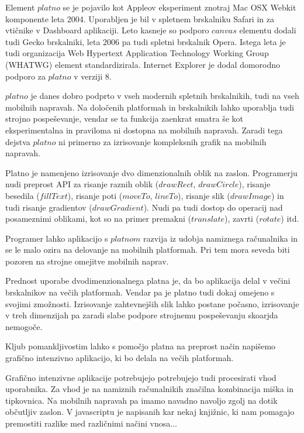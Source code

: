 Element $platno$ se je pojavilo kot Appleov eksperiment znotraj Mac OSX Webkit komponente leta 2004. Uporabljen je bil v spletnem brskalniku Safari in za vtičnike v Dashboard aplikaciji. Leto kasneje so podporo $canvas$ elementu dodali tudi Gecko brskalniki, leta 2006 pa tudi spletni brskalnik Opera. Istega leta je tudi organizacija Web Hypertext Application Technology Working Group (WHATWG) element standardizirala. Internet Explorer je dodal domorodno podporo za $platno$ v verziji 8.

$platno$ je danes dobro podprto v vseh modernih spletnih brskalnikih, tudi na vseh mobilnih napravah. Na določenih platformah in brskalnikih lahko uporablja tudi strojno pospeševanje, vendar se ta funkcija zaenkrat smatra še kot eksperimentalna in praviloma ni dostopna na mobilnih napravah. Zaradi tega dejstva $platno$ ni primerno za izrisovanje kompleksnih grafik na mobilnih napravah.

Platno je namenjeno izrisovanje dvo dimenzionalnih oblik na zaslon. Programerju nudi preprost API za risanje raznih oblik ($drawRect$, $drawCircle$), risanje besedila ($fillText$), risanje poti ($moveTo$, $lineTo$), risanje slik ($drawImage$) in tudi risanje gradientov ($drawGradient$). Nudi pa tudi dostop do operacij nad posameznimi oblikami, kot so na primer premakni ($translate$), zavrti ($rotate$) itd. 

Programer lahko aplikacijo s $platnom$ razvija iz udobja namiznega računalnika in se le malo ozira na delovanje na mobilnih platformah. Pri tem mora seveda biti pozoren na strojne omejitve mobilnih naprav. 

Prednost uporabe dvodimenzionalnega platna je, da bo aplikacija delal v večini brskalnikov na večih platformah. Vendar pa je platno tudi dokaj omejeno s svojimi zmožnosti. Izrisovanje zahtevnejših slik lahko postane počasno, izrisovanje v treh dimenzijah pa zaradi slabe podpore strojnemu pospeševanju skoarjda nemogoče. 

Kljub pomankljivostim lahko s pomočjo platna na preprost način napišemo grafično intenzivno aplikacijo, ki bo delala na večih platformah. 

Grafično intenzivne aplikacije potrebujejo potrebujejo tudi procesirati vhod uporabnika. Za vhod je na namiznih računalnikih značilna kombinacija miška in tipkovnica. Na mobilnih napravah pa imamo navadno navoljo zgolj na dotik občutljiv zaslon. V javascriptu je napisanih kar nekaj knjižnic, ki nam pomagajo premostiti razlike med različnimi načini vnosa...

